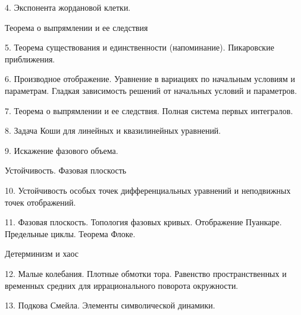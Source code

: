 4. Экспонента  жордановой клетки.

\subhead Теорема о выпрямлении и ее следствия
\endsubhead

5. Теорема существования и единственности (напоминание).
Пикаровские приближения.

6. Производное отображение. Уравнение в вариациях по начальным
условиям и параметрам. Гладкая зависимость решений от начальных
условий и параметров.

7. Теорема о выпрямлении и ее следствия. Полная система первых
интегралов.

8. Задача Коши для линейных и квазилинейных уравнений.

9. Искажение фазового объема.


\subhead Устойчивость. Фазовая плоскость
\endsubhead

10. Устойчивость особых точек дифференциальных уравнений и
неподвижных точек отображений.

11. Фазовая плоскость. Топология фазовых кривых. Отображение
Пуанкаре. Предельные циклы. Теорема Флоке.


\subhead Детерминизм и хаос
\endsubhead

12. Малые колебания. Плотные обмотки тора. Равенство
пространственных и временных средних для иррационального поворота
окружности.

13. Подкова Смейла. Элементы символической динамики.


\enddocument
